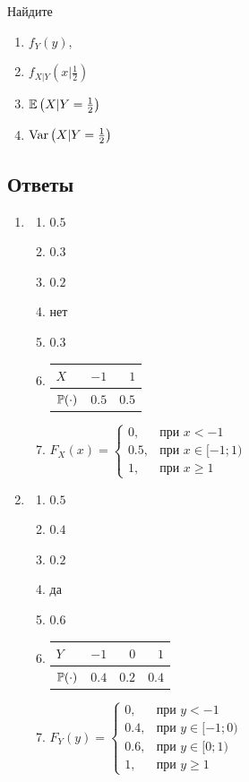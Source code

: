 \begin{enumerate}
Найдите
\begin{enumerate}
\item $f_{Y}(y)$,
\item $f_{X|Y}\left(x|\frac{1}{2}\right)$
\item $\E\left(X|Y = \frac{1}{2}\right)$
\item $\Var\left(X|Y = \frac{1}{2}\right)$
\end{enumerate}

\end{enumerate}

\subsection*{Ответы}

\begin{enumerate}

\item
\begin{enumerate}
\item   $0.5 $
\item   $0.3$
\item   $0.2$
\item   нет
\item   $0.3$
\item
\begin{tabular}{lrr}
\toprule
$X$ & $-1$  & $1$   \\ \midrule
$\P(\cdot)$ & $0.5$ & $0.5$ \\ \bottomrule
\end{tabular}
\item  $F_{X}(x) = \begin{cases}
0, & \text{при } x < -1 \\
0.5 , & \text{при } x \in [-1;1) \\
1, & \text{при }  x \geq 1
\end{cases}$
\end{enumerate}
\item
\begin{enumerate}
\item   $0.5$
\item   $0.4$
\item   $0.2$
\item   да
\item   $0.6$
\item
\begin{tabular}{lrrr}
\toprule
$Y$ & $-1$  & $0$   & $1$   \\ \midrule
$\P(\cdot)$ & $0.4$ & $0.2$ & $0.4$ \\ \bottomrule
\end{tabular}
\item   $F_{Y}(y) = \begin{cases}
0, & \text{при } y < -1 \\
0.4 , & \text{при } y \in [-1;0) \\
0.6, & \text{при }  y \in [0;1)\\
1, & \text{при } y \geq 1
\end{cases}$
\end{enumerate}


\end{enumerate}
